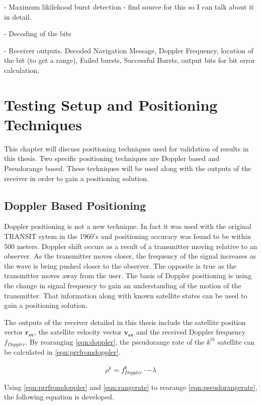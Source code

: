 \documentclass[12pt]{report}
\begin{document}
- Maximum likilehood burst detection
    - find source for this so I can talk about it in detail.

- Decoding of the bits

- Receiver outputs. Decoded Navigation Message, Doppler Frequency, location of the bit (to get a range), Failed bursts, Successful Bursts, output bits for bit error calculation,

\chapter{Testing Setup and Positioning Techniques}
This chapter will discuss positioning techniques used for validation of results in this thesis. Two specific positioning techniques are Doppler based and Pseudorange based. These techniques will be used along with the outputs of the receiver in order to gain a positioning solution.
 
\section{Doppler Based Positioning} \label{sec:DopplerPosTechnique}
Doppler positioning is not a new technique. In fact it was used with the original TRANSIT sytem in the 1960's and positioning accuracy was found to be within 500 meters. Doppler shift occurs as a result of a transmitter moving relative to an observer. As the transmitter moves closer, the frequency of the signal increases as the wave is being pushed closer to the observer. The opposite is true as the transmitter moves away from the user. The basis of Doppler positioning is using the change in signal frequency to gain an understanding of the motion of the transmitter. That information along with known satellite states can be used to gain a positioning solution.

The outputs of the receiver detailed in this thesis include the satellite position vector $\mathbf{r_{sv}}$, the satellite velocity vector $\mathbf{v_{sv}}$ and the received Doppler frequency $f_{Doppler}$. By rearanging \ref{eqn:doppler}, the pseudorange rate of the $k^{th}$ satellite can be calculated in \ref{eqn:prrfromdoppler}.

\begin{equation}
    \dot{\rho^{k}} = f_{Doppler}^{k} \cdot -\lambda
    \label{eqn:prrfromdoppler}
\end{equation}

Using \ref{eqn:prrfromdoppler} and \ref{eqn:rangerate} to rearange \ref{eqn:pseudorangerate}, the following equation is developed.
\end{document}
